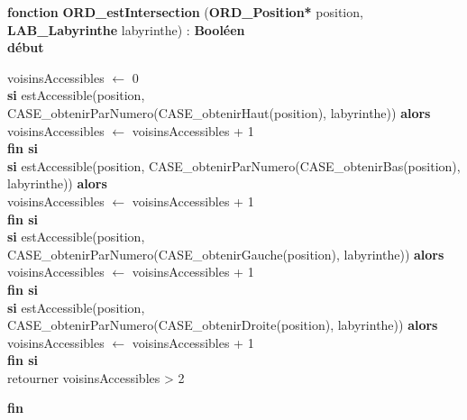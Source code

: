 \documentclass[a4paper, 11pt]{article}
\begin{document}
\noindent\textbf{fonction} \textbf{ORD\_estIntersection} (\textbf{ORD\_Position*} position, \textbf{LAB\_Labyrinthe} labyrinthe) : \textbf{Booléen}\\
\textbf{début}
\begin{flushleft}
    \hspace*{1cm}voisinsAccessibles $\gets$ 0\\
    \hspace*{1cm}\textbf{si} estAccessible(position, CASE\_obtenirParNumero(CASE\_obtenirHaut(position), labyrinthe)) \textbf{alors}\\
    \hspace*{2cm}voisinsAccessibles $\gets$ voisinsAccessibles + 1\\
    \hspace*{1cm}\textbf{fin si}\\
    \hspace*{1cm}\textbf{si} estAccessible(position, CASE\_obtenirParNumero(CASE\_obtenirBas(position), labyrinthe)) \textbf{alors}\\
    \hspace*{2cm}voisinsAccessibles $\gets$ voisinsAccessibles + 1\\
    \hspace*{1cm}\textbf{fin si}\\
    \hspace*{1cm}\textbf{si} estAccessible(position, CASE\_obtenirParNumero(CASE\_obtenirGauche(position), labyrinthe)) \textbf{alors}\\
    \hspace*{2cm}voisinsAccessibles $\gets$ voisinsAccessibles + 1\\
    \hspace*{1cm}\textbf{fin si}\\
    \hspace*{1cm}\textbf{si} estAccessible(position, CASE\_obtenirParNumero(CASE\_obtenirDroite(position), labyrinthe)) \textbf{alors}\\
    \hspace*{2cm}voisinsAccessibles $\gets$ voisinsAccessibles + 1\\
    \hspace*{1cm}\textbf{fin si}\\
    \hspace*{1cm}retourner voisinsAccessibles > 2
\end{flushleft}
\textbf{fin}\\
\end{document}
